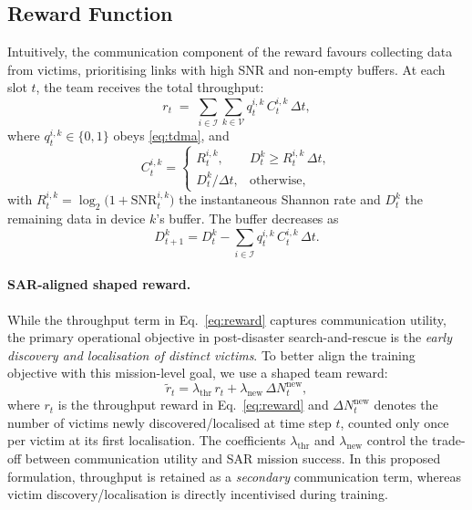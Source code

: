 \documentclass[drones,article,accept,pdftex,moreauthors]{Definitions/mdpi}
\begin{document}
\subsection{Reward Function}\label{sec:reward}

Intuitively, the communication component of the reward favours collecting data from victims,
prioritising links with high SNR and non-empty buffers. At each slot $t$, the team receives
the total throughput:
\begin{equation}
r_t \;=\; \sum_{i\in\mathcal I}\sum_{k\in\mathcal V} q_t^{i,k}\, C_t^{i,k}\,\Delta t,
\label{eq:reward}
\end{equation}
where $q_t^{i,k}\!\in\!\{0,1\}$ obeys \eqref{eq:tdma}, and
\begin{equation}
C_t^{i,k} =
\begin{cases}
R_t^{i,k},              & D_t^{k} \ge R_t^{i,k}\,\Delta t,\\[4pt]
D_t^{k}/\Delta t,       & \text{otherwise},
\end{cases}
\label{eq:throughput}
\end{equation}
with $R_t^{i,k}=\log_2\!\bigl(1+\mathrm{SNR}_t^{i,k}\bigr)$ the instantaneous Shannon
rate and $D_t^{k}$ the remaining data in device $k$’s buffer. The buffer decreases as
\begin{equation}
D_{t+1}^{k}=D_t^{k}-\sum_{i\in\mathcal I} q_t^{i,k}\, C_t^{i,k}\,\Delta t.
\label{eq:buffer_update}
\end{equation}

\paragraph{SAR-aligned shaped reward.}
While the throughput term in Eq.~\eqref{eq:reward} captures communication utility,
the primary operational objective in post-disaster search-and-rescue is the
\emph{early discovery and localisation of distinct victims}. To better align the
training objective with this mission-level goal, we use a shaped team reward:
\begin{equation}
\tilde r_t
=
\lambda_{\mathrm{thr}}\, r_t
+
\lambda_{\mathrm{new}}\, \Delta N_t^{\mathrm{new}},
\label{eq:shaped_reward}
\end{equation}
where $r_t$ is the throughput reward in Eq.~\eqref{eq:reward} and
$\Delta N_t^{\mathrm{new}}$ denotes the number of victims newly discovered/localised
at time step $t$, counted only once per victim at its first localisation.
The coefficients $\lambda_{\mathrm{thr}}$ and $\lambda_{\mathrm{new}}$
control the trade-off between communication utility and SAR mission success.
In this proposed formulation, throughput is retained as a \emph{secondary}
communication term, whereas victim discovery/localisation is directly incentivised
during training.
\end{document}
